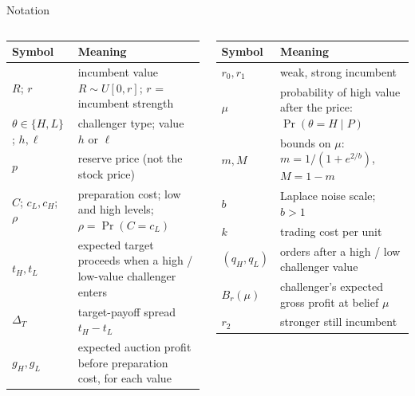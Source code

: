 \documentclass[10pt,aspectratio=169]{beamer}
\newcommand{\NavGap}{\par\vspace{0.45cm}}%
\let\AdapterBackButton\BackButton
\renewcommand{\BackButton}[1]{\NavGap\AdapterBackButton{#1}}%
\begin{document}
\begin{frame}[label=A12]{Notation}
\hypertarget{app:notation}{}
\vspace{4pt}
{\footnotesize
\begin{columns}[T]
\begin{tabular}{@{}l>{\raggedright\arraybackslash}p{4.6cm}@{}}
\toprule
Symbol & Meaning\\
\midrule
$R$; $r$ & incumbent value $R\sim U[0,r]$; $r$ = incumbent strength\\
$\theta\in\{H,L\}$; $h,\ell$ & challenger type; value $h$ or $\ell$\\
$p$ & reserve price (not the stock price)\\
$C$; $c_L,c_H$; $\rho$ & preparation cost; low and high levels; $\rho=\Pr(C=c_L)$\\
$t_H,t_L$ & expected target proceeds when a high / low-value challenger enters\\
$\Delta_T$ & target-payoff spread $t_H-t_L$\\
$g_H,g_L$ & expected auction profit before preparation cost, for each value\\
\bottomrule
\end{tabular}
\begin{tabular}{@{}l>{\raggedright\arraybackslash}p{4.6cm}@{}}
\toprule
Symbol & Meaning\\
\midrule
$r_0,r_1$ & weak, strong incumbent\\
$\mu$ & probability of high value after the price: $\Pr(\theta=H\mid P)$\\
$m,M$ & bounds on $\mu$: $m=1/(1+e^{2/b})$, $M=1-m$\\
$b$ & Laplace noise scale; $b>1$\\
$k$ & trading cost per unit\\
$(q_H,q_L)$ & orders after a high / low challenger value\\
$B_r(\mu)$ & challenger's expected gross profit at belief $\mu$\\
$r_2$ & stronger still incumbent\\
\bottomrule
\end{tabular}
\end{columns}}
\end{frame}
\end{document}
